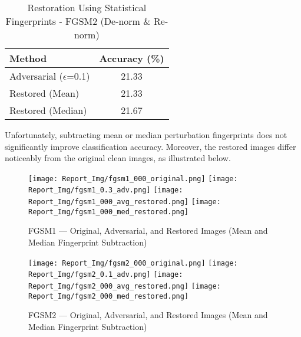 \documentclass[a4paper,12pt]{report}%
\begin{document}
\begin{table}[H]
\centering
\caption{Restoration Using Statistical Fingerprints - FGSM2 (De-norm \& Re-norm)}
\begin{tabular}{|l|c|}
\hline
Method & Accuracy (\%) \\
\hline
Adversarial ($\epsilon$=0.1)        & 21.33 \\
Restored (Mean)   & 21.33 \\
Restored (Median) & 21.67 \\
\hline
\end{tabular}
\end{table}
Unfortunately, subtracting mean or median perturbation fingerprints does not significantly improve classification accuracy. Moreover, the restored images differ noticeably from the original clean images, as illustrated below.

\begin{figure}[!htb]
  \texttt{[image: Report\_Img/fgsm1\_000\_original.png]}
\endminipage\hfill
{}
  \texttt{[image: Report\_Img/fgsm1\_0.3\_adv.png]}
\endminipage\hfill
{}
  \texttt{[image: Report\_Img/fgsm1\_000\_avg\_restored.png]}
\endminipage\hfill
{}%
  \texttt{[image: Report\_Img/fgsm1\_000\_med\_restored.png]}
\endminipage
  \caption{FGSM1 — Original, Adversarial, and Restored Images (Mean and Median Fingerprint Subtraction)}
  \label{fig:fgsm1_restoration}
\end{figure}


\begin{figure}[!htb]
  \texttt{[image: Report\_Img/fgsm2\_000\_original.png]}
\endminipage\hfill
{}
  \texttt{[image: Report\_Img/fgsm2\_0.1\_adv.png]}
\endminipage\hfill
{}
  \texttt{[image: Report\_Img/fgsm2\_000\_avg\_restored.png]}
\endminipage\hfill
{}%
  \texttt{[image: Report\_Img/fgsm2\_000\_med\_restored.png]}
\endminipage
  \caption{FGSM2 — Original, Adversarial, and Restored Images (Mean and Median Fingerprint Subtraction)}
  \label{fig:fgsm2_restoration}
\end{figure}
\end{document}
